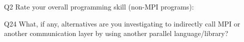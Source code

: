 \begin{description}%
\item{Q2} Rate your overall programming skill (non-MPI programs):%
\item{Q24} What, if any, alternatives are you investigating to indirectly call MPI or another communication layer by using another parallel language/library?%
\end{description}%
